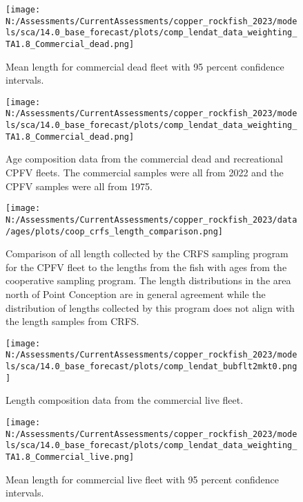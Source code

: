 \documentclass[11pt,
  english,
  letterpaper,
]{article}
\begin{document}
\pagebreak

\begin{figure}
\centering
\texttt{[image: N:/Assessments/CurrentAssessments/copper\_rockfish\_2023/models/sca/14.0\_base\_forecast/plots/comp\_lendat\_data\_weighting\_TA1.8\_Commercial\_dead.png]}
\caption{Mean length for commercial dead fleet with 95 percent confidence intervals.\label{fig:mean-com-dead-len-data}}
\end{figure}

\pagebreak

\begin{figure}
\centering
\texttt{[image: N:/Assessments/CurrentAssessments/copper\_rockfish\_2023/models/sca/14.0\_base\_forecast/plots/comp\_lendat\_data\_weighting\_TA1.8\_Commercial\_dead.png]}
\caption{Age composition data from the commercial dead and recreational CPFV fleets. The commercial samples were all from 2022 and the CPFV samples were all from 1975.\label{fig:com-dead-age-data}}
\end{figure}

\pagebreak

\begin{figure}
\centering
\texttt{[image: N:/Assessments/CurrentAssessments/copper\_rockfish\_2023/data/ages/plots/coop\_crfs\_length\_comparison.png]}
\caption{Comparison of all length collected by the CRFS sampling program for the CPFV fleet to the lengths from the fish with ages from the cooperative sampling program. The length distributions in the area north of Point Conception are in general agreement while the distribution of lengths collected by this program does not align with the length samples from CRFS.\label{fig:coop-len-comparison}}
\end{figure}

\pagebreak

\begin{figure}
\centering
\texttt{[image: N:/Assessments/CurrentAssessments/copper\_rockfish\_2023/models/sca/14.0\_base\_forecast/plots/comp\_lendat\_bubflt2mkt0.png]}
\caption{Length composition data from the commercial live fleet.\label{fig:com-live-len-data}}
\end{figure}

\pagebreak

\begin{figure}
\centering
\texttt{[image: N:/Assessments/CurrentAssessments/copper\_rockfish\_2023/models/sca/14.0\_base\_forecast/plots/comp\_lendat\_data\_weighting\_TA1.8\_Commercial\_live.png]}
\caption{Mean length for commercial live fleet with 95 percent confidence intervals.\label{fig:mean-com-live-len-data}}
\end{figure}
\end{document}
